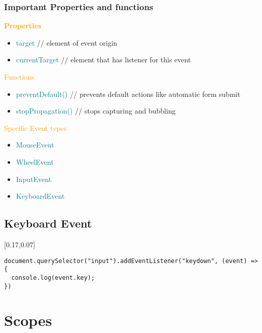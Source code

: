 \documentclass[main.tex,fontsize=6pt,paper=a4,paper=landscape,DIV=calc,]{scrartcl}
\begin{document}
\begin{multicols*}{4}
\subsubsection{Important Properties and functions}  
\textcolor{orange}{\textbf{Properties}}
\begin{itemize}
  \item \textcolor{teal}{target} // element of event origin 
  \item \textcolor{teal}{currentTarget} // element that has listener for this event
\end{itemize}
\textcolor{orange}{Functions}
\begin{itemize}
  \item \textcolor{teal}{preventDefault()} // prevents default actions like automatic form submit
  \item \textcolor{teal}{stopPropagation()} // stops capturing and bubbling
\end{itemize}
\textcolor{orange}{Specific Event types}
\begin{itemize}
  \item \textcolor{teal}{MouseEvent}
  \item \textcolor{teal}{WheelEvent}
  \item \textcolor{teal}{InputEvent}
  \item \textcolor{teal}{KeyboardEvent}
\end{itemize}

\subsection{Keyboard Event}  
[0.17,0.07]
\vspace{-2mm}
\begin{lstlisting}
document.querySelector("input").addEventListener("keydown", (event) => {
  console.log(event.key);
})
\end{lstlisting}
\vspace{2mm}

\section{Scopes}


\end{multicols*}
\end{document}
